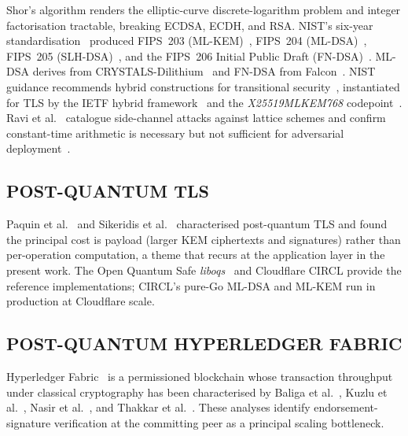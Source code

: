 \documentclass{ieeetj}
\begin{document}
Shor's algorithm renders the elliptic-curve discrete-logarithm problem
and integer factorisation tractable, breaking ECDSA, ECDH, and RSA. NIST's
six-year standardisation~\cite{alagic2022nist} produced FIPS~203
(ML-KEM)~\cite{nist_fips203}, FIPS~204
(ML-DSA)~\cite{nist_fips204}, FIPS~205 (SLH-DSA)~\cite{nist_fips205}, and
the FIPS~206 Initial Public Draft (FN-DSA)~\cite{nist_fips206}. ML-DSA
derives from CRYSTALS-Dilithium~\cite{ducas2018dilithium} and FN-DSA from
Falcon~\cite{pornin2019, prest2020falcon}. NIST guidance recommends
hybrid constructions for transitional security~\cite{barker2020transition,
bindel2017}, instantiated for TLS by the IETF hybrid
framework~\cite{ietf_hybrid_tls} and the \textit{X25519MLKEM768}
codepoint~\cite{ietf_x25519mlkem768}. Ravi et
al.~\cite{ravi2024sidechannel} catalogue side-channel attacks against
lattice schemes and confirm constant-time arithmetic is necessary but not
sufficient for adversarial deployment~\cite{pessl2019}.

\subsection{POST-QUANTUM TLS}

Paquin et al.~\cite{paquin2020benchmark} and Sikeridis et
al.~\cite{sikeridis2020} characterised post-quantum TLS and found the
principal cost is payload (larger KEM ciphertexts and signatures) rather
than per-operation computation, a theme that recurs at the application
layer in the present work. The Open Quantum Safe
\textit{liboqs}~\cite{stebila2016oqs} and Cloudflare CIRCL provide the
reference implementations; CIRCL's pure-Go ML-DSA and ML-KEM run in
production at Cloudflare scale.

\subsection{POST-QUANTUM HYPERLEDGER FABRIC}

Hyperledger Fabric~\cite{androulaki2018} is a permissioned blockchain whose
transaction throughput under classical cryptography has been characterised by
Baliga et al.~\cite{baliga2018performance}, Kuzlu et
al.~\cite{kuzlu2021performance}, Nasir et al.~\cite{nasir2018}, and Thakkar et
al.~\cite{thakkar2018}. These analyses identify endorsement-signature
verification at the committing peer as a principal scaling bottleneck.
\end{document}
